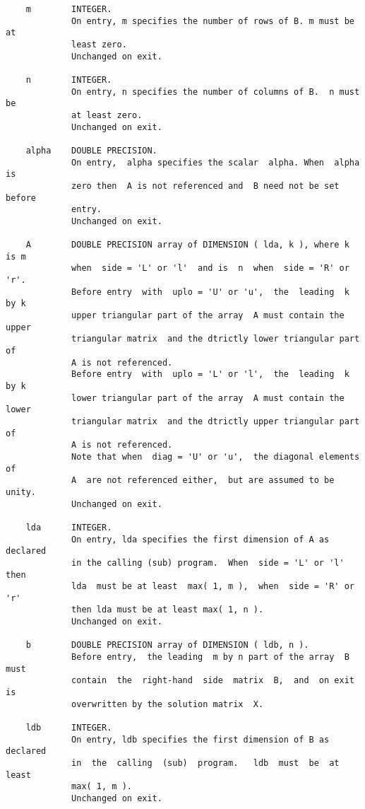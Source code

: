 \documentclass[10pt]{book}
\begin{document}
\begin{verbatim}
    m        INTEGER.
             On entry, m specifies the number of rows of B. m must be at
             least zero.
             Unchanged on exit.
   
    n        INTEGER.
             On entry, n specifies the number of columns of B.  n must be
             at least zero.
             Unchanged on exit.
   
    alpha    DOUBLE PRECISION.
             On entry,  alpha specifies the scalar  alpha. When  alpha is
             zero then  A is not referenced and  B need not be set before
             entry.
             Unchanged on exit.
   
    A        DOUBLE PRECISION array of DIMENSION ( lda, k ), where k is m
             when  side = 'L' or 'l'  and is  n  when  side = 'R' or 'r'.
             Before entry  with  uplo = 'U' or 'u',  the  leading  k by k
             upper triangular part of the array  A must contain the upper
             triangular matrix  and the dtrictly lower triangular part of
             A is not referenced.
             Before entry  with  uplo = 'L' or 'l',  the  leading  k by k
             lower triangular part of the array  A must contain the lower
             triangular matrix  and the dtrictly upper triangular part of
             A is not referenced.
             Note that when  diag = 'U' or 'u',  the diagonal elements of
             A  are not referenced either,  but are assumed to be  unity.
             Unchanged on exit.
   
    lda      INTEGER.
             On entry, lda specifies the first dimension of A as declared
             in the calling (sub) program.  When  side = 'L' or 'l'  then
             lda  must be at least  max( 1, m ),  when  side = 'R' or 'r'
             then lda must be at least max( 1, n ).
             Unchanged on exit.
   
    b        DOUBLE PRECISION array of DIMENSION ( ldb, n ).
             Before entry,  the leading  m by n part of the array  B must
             contain  the  right-hand  side  matrix  B,  and  on exit  is
             overwritten by the solution matrix  X.
   
    ldb      INTEGER.
             On entry, ldb specifies the first dimension of B as declared
             in  the  calling  (sub)  program.   ldb  must  be  at  least
             max( 1, m ).
             Unchanged on exit.
\end{verbatim}

\normalsize
\end{document}
